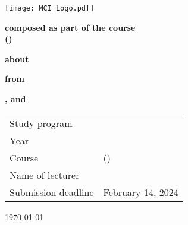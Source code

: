 
\thispagestyle{empty}
\thispdfpagelabel{} %
\begin{center}
	\textbf{\Huge \university}\par
	\vspace{8ex}\par
	\textbf{\LARGE \department}\par
	\vspace{4ex}\par
	\textbf{\Large \studyProgram}\par
	\vspace{4ex}\par
	\texttt{[image: MCI\_Logo.pdf]}\par
	\vspace{4ex}\par
	\textbf{\LARGE \docType}\par
	\vspace{2ex}\par
	\textbf{composed as part of the course\\[0.5ex] \courseName{} (\courseCode)}\par
	\vspace{4ex}\par
	\textbf{about}\par
	\vspace{4ex}\par
	\textbf{\LARGE \docTitle}\par
	\vspace{4ex}\par
	\textbf{from}\par
	\vspace{4ex}\par
	\textbf{\Large \href{\authorAContact}{\authorAName}, \href{\authorBContact}{\authorBName} and \href{\authorContact}{\authorCName}}
\end{center}
\vspace{4ex}
\begin{tabular}{ll}
	Study program & \studyProgram\\[0.5ex]
	Year & \studyYear\\[0.5ex]
	Course & \courseName{} (\courseCode)\\[0.5ex]
	Name of lecturer & \href{\lecturerContact}{\lecturerName}\\[0.5ex]
	Submission deadline & February 14, 2024
\end{tabular}
\vfill
\begin{center}
	\today
\end{center}
